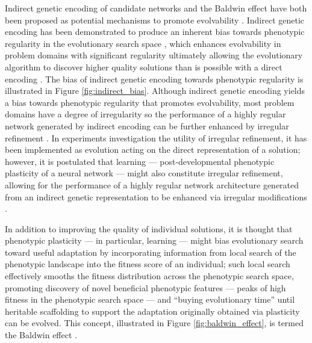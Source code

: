 Indirect genetic encoding of candidate networks and the Baldwin effect have both been proposed as potential mechanisms to promote evolvability \autocite{Reisinger2007AcquiringRepresentations,Downing2010TheNetworks}. Indirect genetic encoding has been demonstrated to produce an inherent bias towards phenotypic regularity in the evolutionary search space \autocite{Tonelli2013OnNetworks}, which enhances evolvability in problem domains with significant regularity ultimately allowing the evolutionary algorithm to discover higher quality solutions than is possible with a direct encoding \autocite{Clune2011OnRegularity}. The bias of indirect genetic encoding towards phenotypic regularity is illustrated in Figure \ref{fig:indirect_bias}. Although indirect genetic encoding yields a bias towards phenotypic regularity that promotes evolvability, most problem domains have a degree of irregularity so the performance of a highly regular network generated by indirect encoding can be further enhanced by irregular refinement \autocite{Clune2011OnRegularity}. In experiments investigation the utility of irregular refinement, it has been implemented as evolution acting on the direct representation of a solution; however, it is postulated that learning --- post-developmental phenotypic plasticity of a neural network --- might also constitute irregular refinement, allowing for the performance of a highly regular network architecture generated from an indirect genetic representation to be enhanced via irregular modifications \autocite{Clune2011OnRegularity}. 

In addition to improving the quality of individual solutions, it is thought that phenotypic plasticity --- in particular, learning --- might bias evolutionary search toward useful adaptation by incorporating information from local search of the phenotypic landscape into the fitness score of an individual; such local search effectively smooths the fitness distribution across the phenotypic search space, promoting discovery of novel beneficial phenotypic features --- peaks of high fitness in the phenotypic search space --- and ``buying evolutionary time'' until heritable scaffolding to support the adaptation originally obtained via plasticity can be evolved. This concept, illustrated in Figure \ref{fig:baldwin_effect}, is termed the Baldwin effect \autocite{Downing2010TheNetworks,Downing2009ComputationalEffect}.




